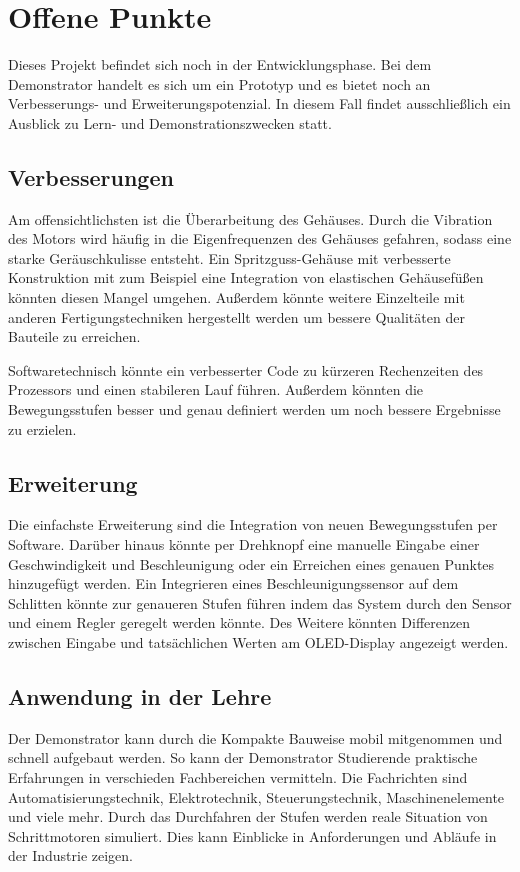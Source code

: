 %
%
%

\chapter{Offene Punkte}

Dieses Projekt befindet sich noch in der Entwicklungsphase. Bei dem Demonstrator handelt es sich um ein Prototyp und es bietet noch an Verbesserungs- und Erweiterungspotenzial. In diesem Fall findet ausschließlich ein Ausblick zu Lern- und Demonstrationszwecken statt. 

\section{Verbesserungen}

Am offensichtlichsten ist die Überarbeitung des Gehäuses. Durch die Vibration des Motors wird häufig in die Eigenfrequenzen des Gehäuses gefahren, sodass eine starke Geräuschkulisse entsteht. Ein Spritzguss-Gehäuse mit verbesserte Konstruktion mit zum Beispiel eine Integration von elastischen Gehäusefüßen könnten diesen Mangel umgehen. Außerdem könnte weitere Einzelteile mit anderen Fertigungstechniken hergestellt werden um bessere Qualitäten der Bauteile zu erreichen.

Softwaretechnisch könnte ein verbesserter Code zu kürzeren Rechenzeiten des Prozessors und einen stabileren Lauf führen. Außerdem könnten die Bewegungsstufen besser und genau definiert werden um noch bessere Ergebnisse zu erzielen.   


\section{Erweiterung}

Die einfachste Erweiterung sind die Integration von neuen Bewegungsstufen per Software. Darüber hinaus könnte per Drehknopf eine manuelle Eingabe einer Geschwindigkeit und Beschleunigung oder ein Erreichen eines genauen Punktes hinzugefügt werden. Ein Integrieren eines Beschleunigungssensor auf dem Schlitten könnte zur genaueren Stufen führen indem das System durch den Sensor und einem Regler geregelt werden könnte. Des Weitere könnten Differenzen zwischen Eingabe und tatsächlichen Werten am OLED-Display angezeigt werden. 

\section{Anwendung in der Lehre}

Der Demonstrator kann durch die Kompakte Bauweise mobil mitgenommen und schnell aufgebaut werden. So kann der Demonstrator Studierende praktische Erfahrungen in verschieden Fachbereichen vermitteln. Die Fachrichten sind Automatisierungstechnik, Elektrotechnik, Steuerungstechnik, Maschinenelemente und viele mehr. Durch das Durchfahren der Stufen werden reale Situation von Schrittmotoren simuliert. Dies kann Einblicke in Anforderungen und Abläufe in der Industrie zeigen. 
